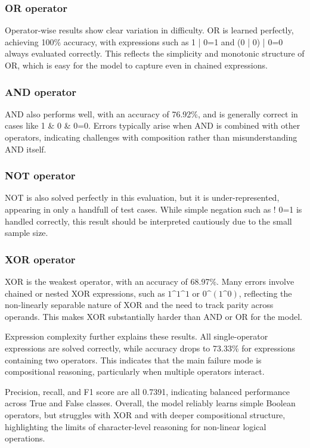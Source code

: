 \subsubsection{OR operator}
Operator-wise results show clear variation in difficulty. OR is learned perfectly, achieving 100\% accuracy, with expressions such as 1 | 0=1 and (0 | 0) | 0=0 always evaluated correctly. This reflects the simplicity and monotonic structure of OR, which is easy for the model to capture even in chained expressions. 

\subsubsection{AND operator}
AND also performs well, with an accuracy of 76.92\%, and is generally correct in cases like 1 \& 0 \& 0=0. Errors typically arise when AND is combined with other operators, indicating challenges with composition rather than misunderstanding AND itself.

\subsubsection{NOT operator}
NOT is also solved perfectly in this evaluation, but it is under-represented, appearing in only a handfull of test cases. While simple negation such as ! 0=1 is handled correctly, this result should be interpreted cautiously due to the small sample size.

\subsubsection{XOR operator}
XOR is the weakest operator, with an accuracy of 68.97\%. Many errors involve chained or nested XOR expressions, such as $1 \text{\textasciicircum} 1 \text{\textasciicircum} 1$ or $0 \text{\textasciicircum} (1 \text{\textasciicircum} 0)$, reflecting the non-linearly separable nature of XOR and the need to track parity across operands. This makes XOR substantially harder than AND or OR for the model.

Expression complexity further explains these results. All single-operator expressions are solved correctly, while accuracy drops to 73.33\% for expressions containing two operators. This indicates that the main failure mode is compositional reasoning, particularly when multiple operators interact.

Precision, recall, and F1 score are all 0.7391, indicating balanced performance across True and False classes. Overall, the model reliably learns simple Boolean operators, but struggles with XOR and with deeper compositional structure, highlighting the limits of character-level reasoning for non-linear logical operations.


